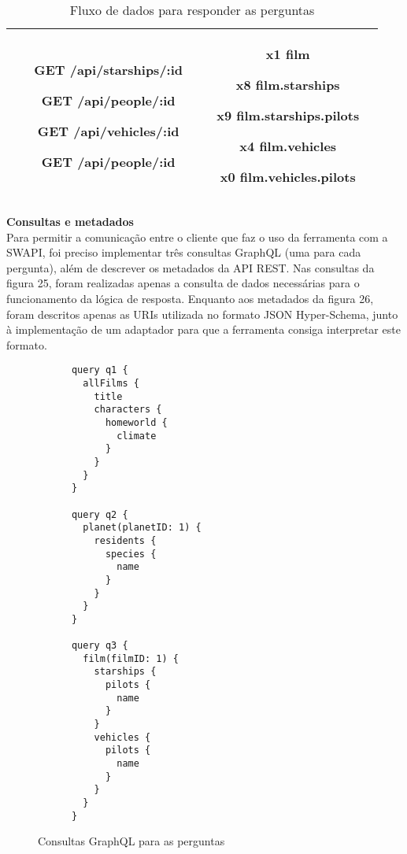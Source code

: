 \begin{table}[H]
\begin{tabular}{|c|c|c|}
\begin{minipage}[t]{0.3\textwidth}
\begin{itemize}
        \item[\textbf{GET}] /api/starships/:id
        \item[\textbf{GET}] /api/people/:id
        \item[\textbf{GET}] /api/vehicles/:id
        \item[\textbf{GET}] /api/people/:id
      \end{itemize}
    \end{minipage} & \begin{minipage}[t]{0.5\textwidth}
      \begin{itemize}
        \item[\textbf{x1}] film
        \item[\textbf{x8}] film.starships
        \item[\textbf{x9}] film.starships.pilots
        \item[\textbf{x4}] film.vehicles
        \item[\textbf{x0}] film.vehicles.pilots
      \end{itemize}
    \end{minipage} \\
    \hline
  \end{tabular}
  \caption{Fluxo de dados para responder as perguntas}
\end{table}

\textbf{Consultas e metadados} \\

Para permitir a comunicação entre o cliente que faz o uso da ferramenta com a SWAPI, foi preciso implementar três consultas GraphQL (uma para cada pergunta), além de descrever os metadados da API REST. Nas consultas da figura 25, foram realizadas apenas a consulta de dados necessárias para o funcionamento da lógica de resposta. Enquanto aos metadados da figura 26, foram descritos apenas as URIs utilizada no formato JSON Hyper-Schema, junto à implementação de um adaptador para que a ferramenta consiga interpretar este formato.

\begin{figure}[H]
  \centering
  \begin{verbatim}
      query q1 {
        allFilms {
          title
          characters {
            homeworld {
              climate
            }
          }
        }
      }

      query q2 {
        planet(planetID: 1) {
          residents {
            species {
              name
            }
          }
        }
      }

      query q3 {
        film(filmID: 1) {
          starships {
            pilots {
              name
            }
          }
          vehicles {
            pilots {
              name
            }
          }
        }
      }
  \end{verbatim}
  \caption{Consultas GraphQL para as perguntas}
\end{figure}

